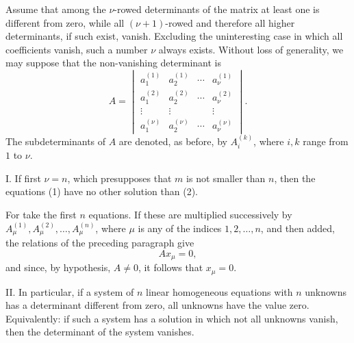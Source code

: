 \documentclass[11pt]{article}
\begin{document}
Assume that among the \(\nu\)-rowed determinants of the matrix at least one is different from zero, while all \((\nu+1)\)-rowed and therefore all higher determinants, if such exist, vanish.  Excluding the uninteresting case in which all coefficients vanish, such a number \(\nu\) always exists.  Without loss of generality, we may suppose that the non-vanishing determinant is
\begin{equation}
        A=\begin{vmatrix}
        a_1^{(1)}&a_2^{(1)}&\cdots&a_\nu^{(1)}\\
        a_1^{(2)}&a_2^{(2)}&\cdots&a_\nu^{(2)}\\
        \vdots&\vdots&&\vdots\\
        a_1^{(\nu)}&a_2^{(\nu)}&\cdots&a_\nu^{(\nu)}
        \end{vmatrix}.
\tag{4}
\end{equation}
The subdeterminants of \(A\) are denoted, as before, by \(A_i^{(k)}\), where \(i,k\) range from \(1\) to \(\nu\).

I. If first \(\nu=n\), which presupposes that \(m\) is not smaller than \(n\), then the equations (1) have no other solution than (2).

For take the first \(n\) equations.  If these are multiplied successively by \(A_\mu^{(1)},A_\mu^{(2)},\ldots,A_\mu^{(n)}\), where \(\mu\) is any of the indices \(1,2,\ldots,n\), and then added, the relations of the preceding paragraph give
\[
        A x_\mu=0,
\]
and since, by hypothesis, \(A\ne0\), it follows that \(x_\mu=0\).

II. In particular, if a system of \(n\) linear homogeneous equations with \(n\) unknowns has a determinant different from zero, all unknowns have the value zero.  Equivalently: if such a system has a solution in which not all unknowns vanish, then the determinant of the system vanishes.
\end{document}
